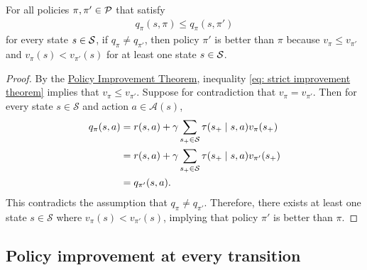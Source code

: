 \begin{lemma}
\label{thm: strict improvement theorem}
For all policies $\pi, \pi' \in \mathcal{P}$ that satisfy
\begin{align}
\label{eq: strict improvement theorem}
q_\pi(s,\pi) \le q_\pi(s,\pi')
\end{align}
for every state $s \in \mathcal{S}$,
if $q_\pi \neq q_{\pi'}$, then policy $\pi'$ is better than $\pi$ because $v_{\pi} \le v_{\pi'}$ and $v_{\pi}(s) < v_{\pi'}(s)$ for at least one state $s \in \mathcal{S}$.
\end{lemma}
\vspace{-0.7cm}
\begin{proof}
By the \hyperref[thm: policy improvement theorem]{Policy Improvement Theorem}, inequality \eqref{eq: strict improvement theorem} implies that $v_\pi \le v_{\pi'}$.
Suppose for contradiction that $v_{\pi} = v_{\pi'}$. Then for every state $s \in \mathcal S$ and action $a \in \mathcal A(s)$,
\begin{align*}
q_{\pi}(s,a) 
&= r(s,a) + \gamma \sum_{s_+ \in \mathcal S} \tau (s_+ \mid s,a) v_{\pi}(s_+)
\\
&= r(s,a) + \gamma \sum_{s_+ \in \mathcal S} \tau (s_+ \mid s,a) v_{\pi'}(s_+)
\\
&= q_{\pi'}(s,a).
\end{align*}
This contradicts the assumption that $q_\pi \neq q_{\pi'}$. Therefore, there exists at least one state $s \in \mathcal S$ where $v_{\pi}(s) < v_{\pi'}(s)$, implying that policy $\pi'$ is better than $\pi$.
\end{proof}




\subsection{Policy improvement at every transition}



